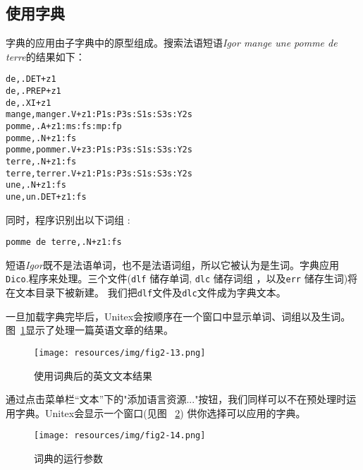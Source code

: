 \subsection{使用字典}
\label{text-applying-dictionaries}
字典的应用由子字典中的原型组成。搜索法语短语\textit{Igor mange une pomme de terre}的结果如下：

\bigskip
\begin{verbatim}
de,.DET+z1
de,.PREP+z1
de,.XI+z1
mange,manger.V+z1:P1s:P3s:S1s:S3s:Y2s
pomme,.A+z1:ms:fs:mp:fp
pomme,.N+z1:fs
pomme,pommer.V+z3:P1s:P3s:S1s:S3s:Y2s
terre,.N+z1:fs
terre,terrer.V+z1:P1s:P3s:S1s:S3s:Y2s
une,.N+z1:fs
une,un.DET+z1:fs
\end{verbatim}

\bigskip
\noindent 同时，程序识别出以下词组
:

\bigskip
\begin{verbatim}
pomme de terre,.N+z1:fs
\end{verbatim}

\bigskip
\noindent 短语\textit{Igor}既不是法语单词，也不是法语词组，所以它被认为是生词。字典应用\verb+Dico+.程序来处理。三个文件(\verb+dlf+ 储存单词, \verb+dlc+ 储存词组 ，以及\verb+err+ 储存生词)将在文本目录下被新建。 我们把\verb+dlf+文件及\verb+dlc+文件成为字典文本。

\bigskip
\noindent 一旦加载字典完毕后，Unitex会按顺序在一个窗口中显示单词、词组以及生词。图~\ref{fig-Dico-application-results}显示了处理一篇英语文章的结果。

\begin{figure}[!ht]
\begin{center}
\texttt{[image: resources/img/fig2-13.png]}
\caption{使用词典后的英文文本结果\label{fig-Dico-application-results}}
\end{center}
\end{figure}

\bigskip
\noindent 通过点击菜单栏“文本”下的"添加语言资源..."按钮，我们同样可以不在预处理时运用字典。Unitex会显示一个窗口(见图 ~\ref{fig-Dico-configuration}) 供你选择可以应用的字典。


\begin{figure}[!ht]
\begin{center}
\texttt{[image: resources/img/fig2-14.png]}
\caption{词典的运行参数\label{fig-Dico-configuration}}
\end{center}
\end{figure}


